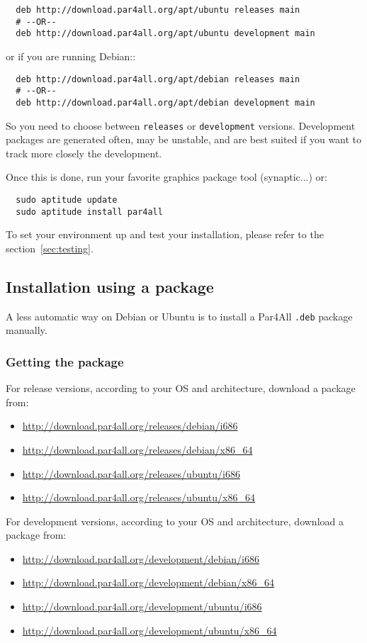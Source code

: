 \documentclass[a4paper]{article}
\begin{document}
\begin{verbatim}
  deb http://download.par4all.org/apt/ubuntu releases main
  # --OR--
  deb http://download.par4all.org/apt/ubuntu development main
\end{verbatim}

or if you are running Debian::
\begin{verbatim}
  deb http://download.par4all.org/apt/debian releases main
  # --OR--
  deb http://download.par4all.org/apt/debian development main
\end{verbatim}

So you need to choose between \texttt{releases} or \texttt{development}
versions. Development packages are generated often, may be unstable, and
are best suited if you want to track more closely the \Apfa development.

Once this is done, run your favorite graphics package tool
(synaptic...) or:
\begin{verbatim}
  sudo aptitude update
  sudo aptitude install par4all
\end{verbatim}

To set your environment up and test your \Apfa
installation, please refer to the section~\ref{sec:testing}.


\subsection{Installation using a package}

A less automatic way on Debian or Ubuntu is to install a Par4All
\texttt{.deb} package manually.

\subsubsection{Getting the package}

For release versions, according to your OS and architecture, download a package from:
\begin{itemize}
\item \url{http://download.par4all.org/releases/debian/i686}
\item \url{http://download.par4all.org/releases/debian/x86_64}
\item \url{http://download.par4all.org/releases/ubuntu/i686}
\item \url{http://download.par4all.org/releases/ubuntu/x86_64}
\end{itemize}


For development versions, according to your OS and architecture, download a package from:
\begin{itemize}
\item \url{http://download.par4all.org/development/debian/i686}
\item \url{http://download.par4all.org/development/debian/x86_64}
\item \url{http://download.par4all.org/development/ubuntu/i686}
\item \url{http://download.par4all.org/development/ubuntu/x86_64}
\end{itemize}
\end{document}
